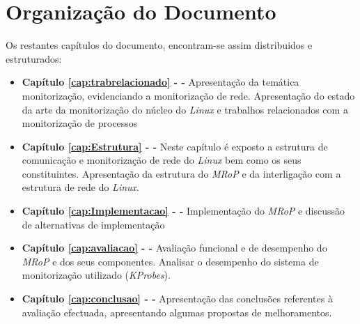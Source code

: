 \bigskip 


\section{Organização do Documento}
\label{sec:intro_document_outline}

Os restantes capítulos do documento, encontram-se assim distribuidos e estruturados:

\begin{itemize}
	\item \textbf{Capítulo \ref{cap:trabrelacionado} -  - } Apresentação da temática monitorização, evidenciando a monitorização de rede. Apresentação do estado da arte da monitorização do núcleo do \textit{Linux} e trabalhos relacionados com a monitorização de processos

	\item \textbf{Capítulo \ref{cap:Estrutura} -   - } Neste capítulo é exposto a estrutura de comunicação e monitorização de rede do \textit{Linux} bem como os seus constituintes. Apresentação da estrutura do \textit{MRoP} e da interligação com a estrutura de rede do \textit{Linux}.

	\item \textbf{Capítulo \ref{cap:Implementacao} -  - } Implementação do \textit{MRoP} e discussão de alternativas de implementação

	\item \textbf{Capítulo \ref{cap:avaliacao} -  - } Avaliação funcional e de desempenho do \textit{MRoP} e dos seus componentes. Analisar o desempenho do sistema de monitorização utilizado (\textit{KProbes}).

	\item \textbf{Capítulo \ref{cap:conclusao} -  - } Apresentação das conclusões referentes à avaliação efectuada, apresentando algumas propostas de melhoramentos.

\end{itemize}
